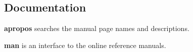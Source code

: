 \subsection{Documentation}
\textbf{apropos} searches the manual page names and descriptions.

\textbf{man} is an interface to the online reference manuals.

